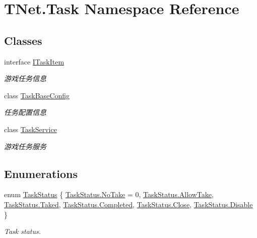 \hypertarget{namespace_t_net_1_1_task}{}\section{T\+Net.\+Task Namespace Reference}
\label{namespace_t_net_1_1_task}
\subsection*{Classes}
\begin{DoxyCompactItemize}
\item 
interface \mbox{\hyperlink{interface_t_net_1_1_task_1_1_i_task_item}{I\+Task\+Item}}
\begin{DoxyCompactList}\small\item\em 游戏任务信息 \end{DoxyCompactList}\item 
class \mbox{\hyperlink{class_t_net_1_1_task_1_1_task_base_config}{Task\+Base\+Config}}
\begin{DoxyCompactList}\small\item\em 任务配置信息 \end{DoxyCompactList}\item 
class \mbox{\hyperlink{class_t_net_1_1_task_1_1_task_service}{Task\+Service}}
\begin{DoxyCompactList}\small\item\em 游戏任务服务 \end{DoxyCompactList}\end{DoxyCompactItemize}
\subsection*{Enumerations}
\begin{DoxyCompactItemize}
\item 
enum \mbox{\hyperlink{namespace_t_net_1_1_task_a130950819ba1d2807bfb809104d1a462}{Task\+Status}} \{ \newline
\mbox{\hyperlink{namespace_t_net_1_1_task_a130950819ba1d2807bfb809104d1a462a3e7e8976a88bdd1636b8eddea17323d6}{Task\+Status.\+No\+Take}} = 0, 
\mbox{\hyperlink{namespace_t_net_1_1_task_a130950819ba1d2807bfb809104d1a462a03edb7e03f643bc57642ec5c9456df17}{Task\+Status.\+Allow\+Take}}, 
\mbox{\hyperlink{namespace_t_net_1_1_task_a130950819ba1d2807bfb809104d1a462afa6641d3577a40718501ce96ff9c5380}{Task\+Status.\+Taked}}, 
\mbox{\hyperlink{namespace_t_net_1_1_task_a130950819ba1d2807bfb809104d1a462a07ca5050e697392c9ed47e6453f1453f}{Task\+Status.\+Completed}}, 
\newline
\mbox{\hyperlink{namespace_t_net_1_1_task_a130950819ba1d2807bfb809104d1a462ad3d2e617335f08df83599665eef8a418}{Task\+Status.\+Close}}, 
\mbox{\hyperlink{namespace_t_net_1_1_task_a130950819ba1d2807bfb809104d1a462abcfaccebf745acfd5e75351095a5394a}{Task\+Status.\+Disable}}
 \}
\begin{DoxyCompactList}\small\item\em Task status. \end{DoxyCompactList}\end{DoxyCompactItemize}


